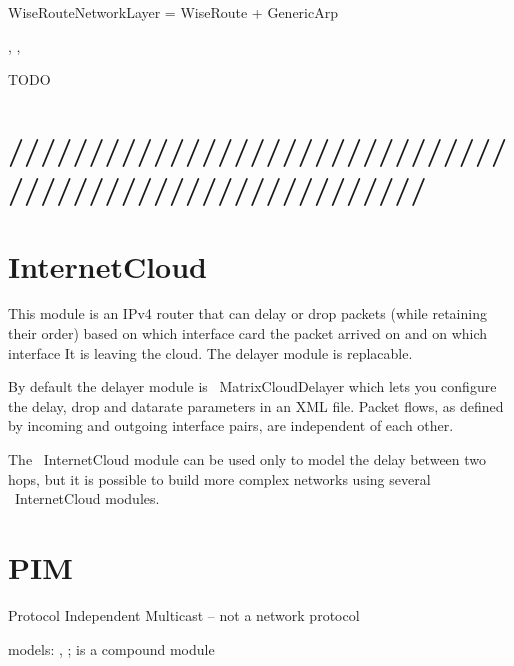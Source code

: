 WiseRouteNetworkLayer = WiseRoute + GenericArp

, , 

TODO

\section{/////////////////////////////////////////////////////////}


\section{InternetCloud}

This module is an IPv4 router that can delay or drop packets (while retaining
their order) based on which interface card the packet arrived on and 
on which interface It is leaving the cloud. The delayer module is replacable.

By default the delayer module is ~MatrixCloudDelayer which lets you configure
the delay, drop and datarate parameters in an XML file. Packet flows, as defined
by incoming and outgoing interface pairs, are independent of each other.

The ~InternetCloud module can be used only to model the delay between two hops, but
it is possible to build more complex networks using several ~InternetCloud modules.

\section{PIM}

Protocol Independent Multicast -- not a network protocol 

models: , ;  is a compound module




